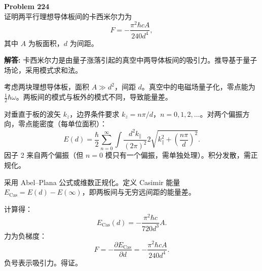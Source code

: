 \documentclass[12pt, a4paper, oneside]{ctexart}
\newenvironment{solution}{\par\noindent\textbf{解答:}\quad}{\par}
\begin{document}
\begin{mdframed}[backgroundcolor=gray!10, linewidth=0pt]
    \textbf{Problem 224} \\
    证明两平行理想导体板间的卡西米尔力为
    \[
    F = -\frac{\pi^2 \hbar c A}{240 d^4},
    \]
    其中 $A$ 为板面积，$d$ 为间距。
\end{mdframed}
\begin{solution}
    卡西米尔力是由量子涨落引起的真空中两导体板间的吸引力。推导基于量子场论，采用模式求和法。
    
    考虑两块理想导体板，面积 $A \gg d^2$，间距 $d$。真空中的电磁场量子化，零点能为 $\frac{1}{2} \hbar \omega$。两板间的模式与板外的模式不同，导致能量差。
    
    对垂直于板的波矢 $k_z$，边界条件要求 $k_z = n\pi/d$，$n=0,1,2,\dots$。对两个偏振方向，零点能密度（每单位面积）：
    \[
    E(d) = \frac{\hbar}{2} \sum_{n=0}^\infty \int \frac{d^2 k_\parallel}{(2\pi)^2} 2 \sqrt{ k_\parallel^2 + \left( \frac{n\pi}{d} \right)^2 }.
    \]
    因子 2 来自两个偏振（但 $n=0$ 模只有一个偏振，需单独处理）。积分发散，需正规化。
    
    采用 Abel–Plana 公式或维数正规化。定义 Casimir 能量 $E_{\text{Cas}} = E(d) - E(\infty)$，即两板间与无穷远间距的能量差。
    
    计算得：
    \[
    E_{\text{Cas}}(d) = -\frac{\pi^2 \hbar c}{720 d^3} A.
    \]
    力为负梯度：
    \[
    F = -\frac{\partial E_{\text{Cas}}}{\partial d} = -\frac{\pi^2 \hbar c A}{240 d^4}.
    \]
    负号表示吸引力。得证。
\end{solution}
\end{document}
